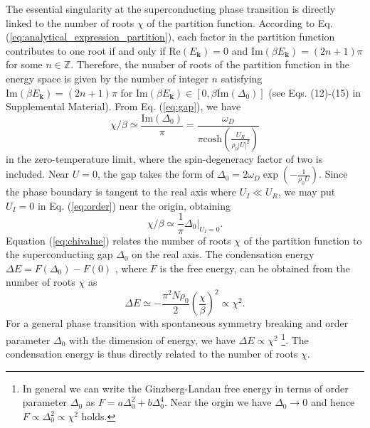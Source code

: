 \documentclass[aps,prl,twocolumn,superscriptaddress]{revtex4-1}
\begin{document}
The essential singularity at the superconducting phase transition is directly linked to the number of roots $\chi$ of the partition function. According to Eq. (\ref{eq:analytical_expression_partition}), each factor in the partition function contributes to one root if and only if $\mathrm{Re}(E_{\bm{k}})=0$ and $\mathrm{Im}(\beta E_{\bm{k}})=(2n+1)\pi$ for some $n\in\mathbb{Z}$. Therefore, the number of roots of the partition function in the energy space is given by the number of integer $n$ satisfying $\mathrm{Im}(\beta E_{\bm{k}})=(2n+1)\pi$ for $ \mathrm{Im}(\beta E_{\bm{k}})\in [0, \beta \text{Im}(\Delta_0)]$ (see Eqs. (12)-(15) in Supplemental Material). From Eq. (\ref{eq:gap}), we have
\begin{equation}
\chi/\beta\simeq\frac{\text{Im}(\Delta_0)}{\pi}=\frac{\omega_{D}}{\pi\text{cosh}(\frac{U_{R}}{\rho_{0}|U|^{2}})}\label{eq:order}
\end{equation}
in the zero-temperature limit, where the spin-degeneracy factor of two is included. %
Near $U=0$, the gap takes the form of $\Delta_0=2\omega_{D}\exp(-\frac{1}{\rho_{0}U})$.
Since the phase boundary is tangent to the real axis where $U_{I}\ll U_{R}$,
we may put $U_{I}=0$ in Eq. (\ref{eq:order}) near the origin, obtaining%
\begin{equation}
\chi/\beta\simeq\frac{1}{\pi}\Delta_0|_{U_I=0}.\label{eq:chivalue}
\end{equation}
Equation (\ref{eq:chivalue}) relates the number of roots $\chi$ of
the partition function %
to the superconducting gap $\Delta_0$ on the real axis. The %
condensation energy $\Delta E=F(\Delta_0)-F(0)$ \cite{Coleman:2015vz}, %
where $F$ is the free energy, can be obtained from the number of roots $\chi$ %
as \cite{SupplementaryMaterial}
\begin{equation}
	\Delta E\simeq-\frac{\pi^2N\rho_0}{2}\left(\frac{\chi}{\beta}\right)^2\propto\chi^2.
\end{equation}
For a general phase transition with spontaneous symmetry breaking and order parameter $\Delta_0$ with the dimension of energy, we have $\Delta E\propto\chi^2$ \footnote{In general we can write the Ginzberg-Landau free energy in terms of order parameter $\Delta_0$ as $F=a\Delta_0^2+b\Delta_0^4$. Near the orgin we have $\Delta_0\to0$ and hence $F\propto\Delta_0^2\propto\chi^2$ holds.}. The condensation energy is thus directly related to the number of roots $\chi$. 
\end{document}
